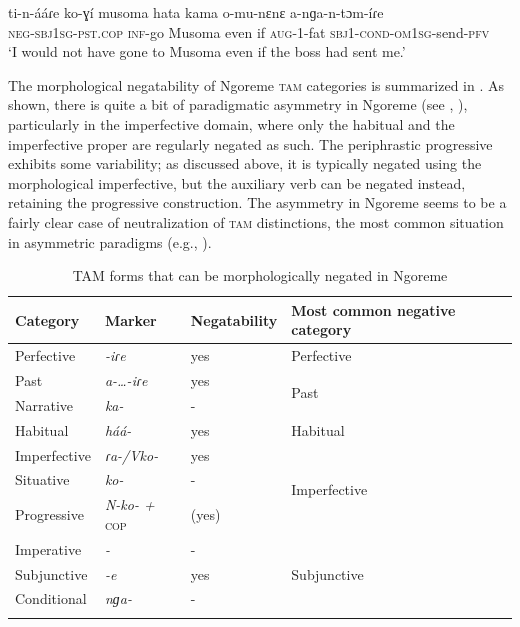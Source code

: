 \documentclass[output=paper,colorlinks,citecolor=brown,draftmode]{langscibook}
\begin{document}
\ea\label{ex:ngo:16} 
    \gll ti-n-ááɾe ko-ɣí musoma hata kama o-mu-nɛnɛ a-nɡa-n-tɔm-íɾe\\ 
        \textsc{neg-sbj1sg-pst.cop} \textsc{inf}{}-go Musoma even if \textsc{aug}{}-1-fat \textsc{sbj1-cond-om1sg}{}-send\textsc{{}-pfv}\\
    \glt ‘I would not have gone to Musoma even if the boss had sent me.’
\z 

The morphological negatability of Ngoreme \textsc{tam} categories is summarized in . As shown, there is quite a bit of paradigmatic asymmetry in Ngoreme (see \citealt{Miestamo2005}, \citeyear{Miestamo2013-wals113}), particularly in the imperfective domain, where only the habitual and the imperfective proper are regularly negated as such. The periphrastic progressive exhibits some variability; as discussed above, it is typically negated using the morphological imperfective, but the auxiliary verb can be negated instead, retaining the progressive construction. The asymmetry in Ngoreme seems to be a fairly clear case of neutralization of \textsc{tam} distinctions, the most common situation in asymmetric paradigms (e.g., \citealt[54ff]{Miestamo2005}).


\begin{table}
\begin{tabularx}{\textwidth}{llllX}
\lsptoprule
Category & Marker & Negatability & Most common negative category \\
\midrule 
Perfective & {\itshape {}-iɾe} & yes & Perfective\\
\midrule 
Past & {\itshape a-…-iɾe} & yes & \multirow{2}{*}{Past}\\
Narrative & {\itshape ka-} & {}- & \\
\midrule 
Habitual & {\itshape háá-} & yes & Habitual\\
\midrule 
Imperfective & {\itshape ɾa-/Vko-} & yes & \multirow{3}{*}{Imperfective}\\
Situative & {\itshape ko-} & {}- & \\
Progressive & \textit{N-ko- +} \textsc{cop} & (yes) & \\
\midrule 
Imperative & {\itshape {}-} & {}- & \multirow{3}{*}{Subjunctive}\\
Subjunctive & {\itshape {}-e} & yes & \\
Conditional & {\itshape nɡa-} & {}- & \\
\lspbottomrule
\end{tabularx}
\caption{TAM forms that can be morphologically negated in Ngoreme}
\label{tab:ngo:1}
\end{table}
\end{document}
